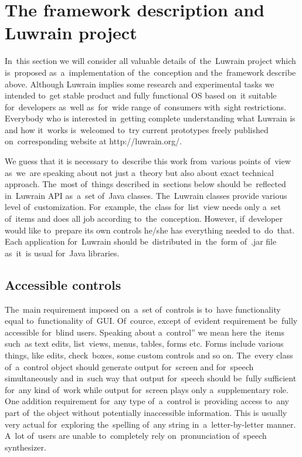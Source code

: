 \documentclass{acm_proc_article-sp}
\begin{document}
\section{The framework description and Luwrain project}

In~this section we will consider all valuable details  
of~the~Luwrain project which is~proposed as~a~implementation of~the~conception and the~framework describe above.
Although Luwrain implies some research and experimental tasks 
we intended  to~get stable product and fully functional OS based on~it 
suitable for~developers as~well as~for~wide range of~consumers with~sight restrictions.
Everybody who is interested in~getting complete understanding what Luwrain is and how it~works 
is~welcomed to~try current prototypes freely published on~corresponding website at http://luwrain.org/.

We guess that it is necessary to~describe this work from~various points of~view 
as~we~are speaking about not just a~theory but also about exact technical approach.
The~most of~things described in~sections below should be~reflected  in~Luwrain API
as~a~set of~Java classes.
The~Luwrain classes provide various level of~customization.
For~example, the~class for~list~view needs only a~set of~items 
and does all job according to~the~conception. 
However, if~developer would like to~prepare its own controls he/she has everything needed to~do~that.
Each application for~Luwrain should be~distributed in~the~form of~.jar file 
as~it~is usual for~Java libraries.

\subsection{Accessible controls}

The~main requirement imposed on~a~set of~controls 
is to~have functionality equal to~functionality of~GUI.
Of~cource, except of~evident requirement be~fully accessible for~blind users.
Speaking about a~control'' we mean here the~items 
such~as text edits, list~views, menus, tables, forms etc.
Forms include various things, like edits, check~boxes, some custom controls and so on.
The~every class of~a~control object should generate output for~screen and for~speech simultaneously and in~such way 
that output for~speech should be~fully sufficient for~any kind of~work while 
output for~screen plays only a~supplementary role.
One addition requirement for~any type of~a~control 
is~providing access to~any part of~the object 
without potentially  inaccessible information.
This is usually very actual for~exploring the~spelling of~any string  in~a~letter-by-letter manner.
A~lot of~users are unable to~completely rely on~pronunciation of~speech synthesizer.
\end{document}

